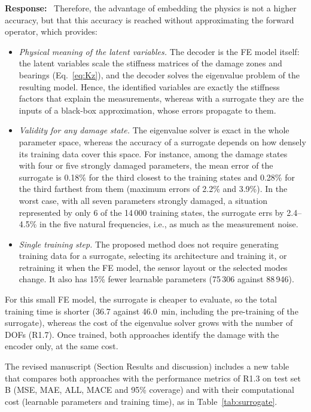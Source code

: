 \documentclass[11pt]{article}
\newenvironment{response}{\par\smallskip\noindent\color{resp}\textbf{Response:}\ }{\par}
\begin{document}
\begin{response}
Therefore, the advantage of embedding the physics is not a higher accuracy, but that this accuracy is reached without approximating the forward operator, which provides:
\begin{itemize}[leftmargin=*]
\item \emph{Physical meaning of the latent variables.} The decoder is the FE model itself: the latent variables scale the stiffness matrices of the damage zones and bearings (Eq.~\eqref{eq:Kz}), and the decoder solves the eigenvalue problem of the resulting model. Hence, the identified variables are exactly the stiffness factors that explain the measurements, whereas with a surrogate they are the inputs of a black-box approximation, whose errors propagate to them.
\item \emph{Validity for any damage state.} The eigenvalue solver is exact in the whole parameter space, whereas the accuracy of a surrogate depends on how densely its training data cover this space. For instance, among the damage states with four or five strongly damaged parameters, the mean error of the surrogate is 0.18\% for the third closest to the training states and 0.28\% for the third farthest from them (maximum errors of 2.2\% and 3.9\%). In the worst case, with all seven parameters strongly damaged, a situation represented by only 6 of the 14\,000 training states, the surrogate errs by 2.4--4.5\% in the five natural frequencies, i.e., as much as the measurement noise.
\item \emph{Single training step.} The proposed method does not require generating training data for a surrogate, selecting its architecture and training it, or retraining it when the FE model, the sensor layout or the selected modes change. It also has 15\% fewer learnable parameters (75\,306 against 88\,946).
\end{itemize}
For this small FE model, the surrogate is cheaper to evaluate, so the total training time is shorter (36.7 against 46.0~min, including the pre-training of the surrogate), whereas the cost of the eigenvalue solver grows with the number of DOFs (R1.7).
Once trained, both approaches identify the damage with the encoder only, at the same cost.

The revised manuscript (Section Results and discussion) includes a new table that compares both approaches with the performance metrics of R1.3 on test set B (MSE, MAE, ALL, MACE and 95\% coverage) and with their computational cost (learnable parameters and training time), as in Table~\ref{tab:surrogate}.


\end{response}
\end{document}
